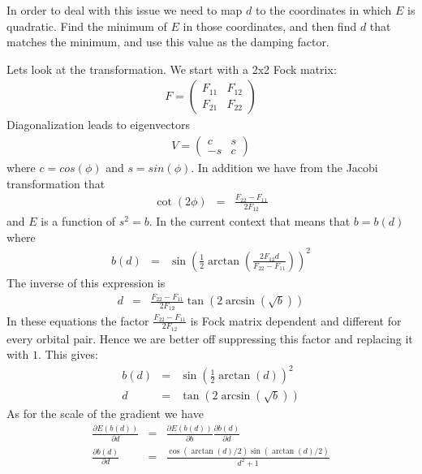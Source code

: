 \documentclass[pra,nofootinbib]{revtex4-1}
\begin{document}
In order to deal with this issue we need to map $d$ to the coordinates in which
$E$ is quadratic. Find the minimum of $E$ in those coordinates, and then find $d$ 
that matches the minimum, and use this value as the damping factor.

Lets look at the transformation.
We start with a 2x2 Fock matrix:
\begin{eqnarray}
   F = \left(\begin{array}{cc}
       F_{11} & F_{12} \\
       F_{21} & F_{22}
       \end{array}\right)
\end{eqnarray}
Diagonalization leads to eigenvectors
\begin{eqnarray}
   V = \left(\begin{array}{cc}
       c      & s      \\
      -s      & c     
       \end{array}\right)
\end{eqnarray}
where $c = cos(\phi)$ and $s = sin(\phi)$. 
In addition we have from the Jacobi transformation that
\begin{eqnarray}
   \cot(2\phi) &=& \frac{F_{22} - F_{11}}{2 F_{12}}
\end{eqnarray}
and $E$ is a function of $s^2 = b$.
In the current context that means that $b = b(d)$ where 
\begin{eqnarray}
   b(d) &=& \sin\left(\frac{1}{2}\arctan\left(\frac{2F_{12}d}{F_{22}-F_{11}}\right)\right)^2
\end{eqnarray}
The inverse of this expression is
\begin{eqnarray}
   d    &=& \frac{F_{22}-F_{11}}{2F_{12}}\tan\left(2\arcsin\left(\sqrt{b}\right)\right)
\end{eqnarray}
In these equations the factor $\frac{F_{22} - F_{11}}{2 F_{12}}$ is Fock matrix dependent
and different for every orbital pair. Hence we are better off suppressing this factor and
replacing it with $1$. This gives:
\begin{eqnarray}
   b(d) &=& \sin\left(\frac{1}{2}\arctan\left(d\right)\right)^2 \\
   d    &=& \tan\left(2\arcsin\left(\sqrt{b}\right)\right)
\end{eqnarray}
As for the scale of the gradient we have
\begin{eqnarray}
   \frac{\partial E(b(d))}{\partial d} 
   &=& \frac{\partial E(b(d))}{\partial b}\frac{\partial b(d)}{\partial d} \\
   \frac{\partial b(d)}{\partial d} 
   &=& \frac{\cos(\arctan(d)/2)\sin(\arctan(d)/2)}{d^2+1}
\end{eqnarray}
\end{document}
